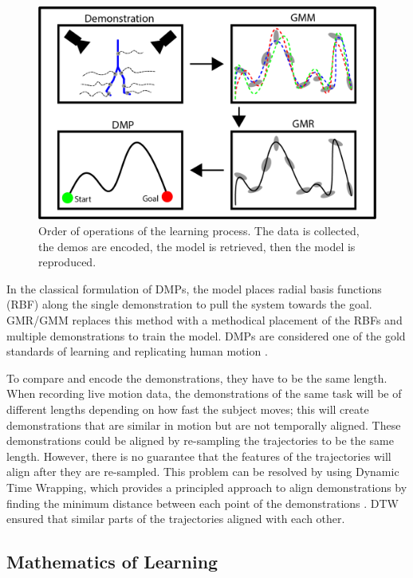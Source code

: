 \begin{figure} 
    \centering 
    \includegraphics[scale=0.25]{images/background/demo_figure.png} 
    \caption[Learning Process]{Order of operations of the learning process. The data is collected, the demos are encoded, the model is retrieved, then the model is reproduced.} 
    \label{fig:demostation} 
\end{figure} 


In the classical formulation of DMPs, the model places radial basis functions (RBF) along the single demonstration to pull the system towards the goal. GMR/GMM replaces this method with a methodical placement of the RBFs and multiple demonstrations to train the model. DMPs are considered one of the gold standards of learning and replicating human motion \cite{nakanishi2004learning}.


To compare and encode the demonstrations, they have to be the same length. When recording live motion data, the demonstrations of the same task will be of different lengths depending on how fast the subject moves; this will create demonstrations that are similar in motion but are not temporally aligned. These demonstrations could be aligned by re-sampling the trajectories to be the same length. However, there is no guarantee that the features of the trajectories will align after they are re-sampled. This problem can be resolved by using Dynamic Time Wrapping, which provides a principled approach to align demonstrations by finding the minimum distance between each point of the demonstrations \cite{muller27dynamic} \cite{JSSv031i07}. DTW ensured that similar parts of the trajectories aligned with each other. 

\subsection{Mathematics of Learning}
 

